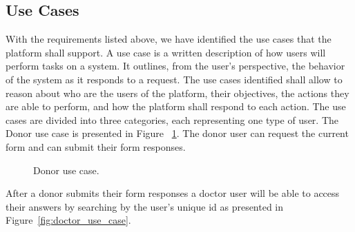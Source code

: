 \subsection{Use Cases}
With the requirements listed above, we have identified the use cases that the platform
shall support. A use case is a written description of how users will perform tasks on
a system. It outlines, from the user's perspective, the behavior of the system as it
responds to a request. The use cases identified shall allow to reason about who are the
users of the platform, their objectives, the actions they are able to perform, and how
the platform shall respond to each action.
The use cases are divided into three categories, each representing one type of user.
The Donor use case is presented in Figure ~\ref{fig:donor_use_case}. The donor user can request the current form and can submit their form responses.

\begin{figure}[H]
	\begin{center}
	\end{center}
	\caption{Donor use case.}\label{fig:donor_use_case}
\end{figure}

After a donor submits their form responses a doctor user will be able to access their answers by searching by the user's unique id as presented in Figure~\ref{fig:doctor_use_case}.

